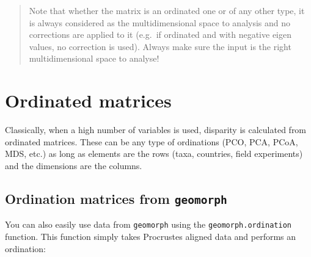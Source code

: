 \documentclass[]{book}
\newenvironment{Shaded}{\begin{snugshade}}{\end{snugshade}}
\newcommand{\KeywordTok}[1]{\textcolor[rgb]{0.13,0.29,0.53}{\textbf{#1}}}
\newcommand{\DataTypeTok}[1]{\textcolor[rgb]{0.13,0.29,0.53}{#1}}
\newcommand{\DecValTok}[1]{\textcolor[rgb]{0.00,0.00,0.81}{#1}}
\newcommand{\StringTok}[1]{\textcolor[rgb]{0.31,0.60,0.02}{#1}}
\newcommand{\OtherTok}[1]{\textcolor[rgb]{0.56,0.35,0.01}{#1}}
\newcommand{\OperatorTok}[1]{\textcolor[rgb]{0.81,0.36,0.00}{\textbf{#1}}}
\newcommand{\NormalTok}[1]{#1}
\theoremstyle{definition}
\theoremstyle{definition}
\theoremstyle{definition}
\theoremstyle{remark}
\begin{document}
\begin{quote}
Note that whether the matrix is an ordinated one or of any other type,
it is always considered as the multidimensional space to analysis and no
corrections are applied to it (e.g.~if ordinated and with negative eigen
values, no correction is used). Always make sure the input is the right
multidimensional space to analyse!
\end{quote}

\section{Ordinated matrices}\label{ordinated-matrices}

Classically, when a high number of variables is used, disparity is
calculated from ordinated matrices. These can be any type of ordinations
(PCO, PCA, PCoA, MDS, etc.) as long as elements are the rows (taxa,
countries, field experiments) and the dimensions are the columns.

\subsection{\texorpdfstring{Ordination matrices from
\texttt{geomorph}}{Ordination matrices from geomorph}}\label{ordination-matrices-from-geomorph}

You can also easily use data from \texttt{geomorph} using the
\texttt{geomorph.ordination} function. This function simply takes
Procrustes aligned data and performs an ordination:

\begin{Shaded}
\end{Shaded}
\end{document}
